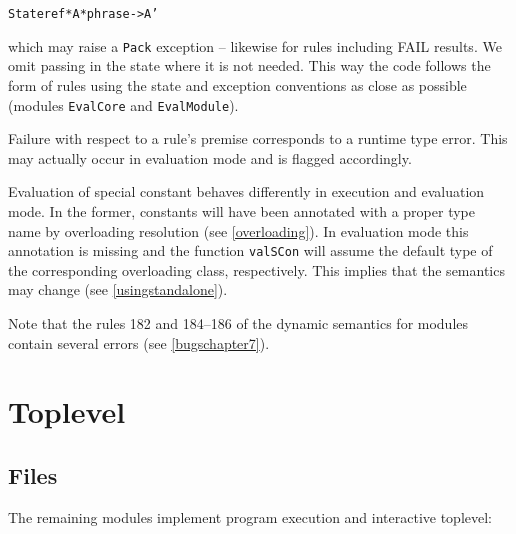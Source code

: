 \documentclass[twoside,titlepage]{article}
\begin{document}
\begin{quoting}
\begin{alltt}
\hfill State ref * A * phrase -> A' \hfill
\end{alltt}
\end{quoting}

which may raise a {\tt Pack} exception -- likewise for rules including FAIL results. We omit passing in the state where it is not needed. This way the code follows the form of rules using the state and exception conventions as close as possible (modules {\tt EvalCore} and {\tt EvalModule}).

Failure with respect to a rule's premise corresponds to a runtime type error. This may actually occur in evaluation mode and is flagged accordingly.%

Evaluation of special constant behaves differently in execution and evaluation mode. In the former, constants will have been annotated with a proper type name by overloading resolution (see \ref{overloading}). In evaluation mode this annotation is missing and the function {\tt valSCon} will assume the default type of the corresponding overloading class, respectively. This implies that the semantics may change (see \ref{usingstandalone}).

Note that the rules 182 and 184--186 of the dynamic semantics for modules contain several errors (see \ref{bugschapter7}).



\section{Toplevel}
\label{toplevel}

\subsection{Files}
\label{toplevelfiles}

The remaining modules implement program execution and interactive toplevel:
\end{document}
